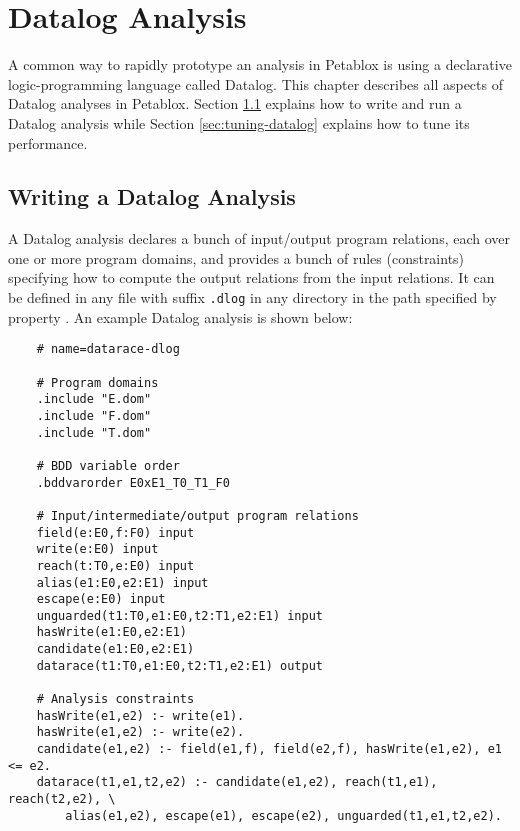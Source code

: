 \chapter{Datalog Analysis}
\label{chap:datalog}

A common way to rapidly prototype an analysis in Petablox is using a declarative
logic-programming language called Datalog.  This chapter describes all aspects
of Datalog analyses in Petablox.  Section \ref{sec:writing-datalog} explains how to
write and run a Datalog analysis while Section \ref{sec:tuning-datalog} explains how
to tune its performance.

\section{Writing a Datalog Analysis}
\label{sec:writing-datalog}

A Datalog analysis declares a bunch of input/output program relations, each over
one or more program domains, and provides a bunch of rules (constraints)
specifying how to compute the output relations from the input relations.  It can
be defined in any file with suffix {\tt .dlog} in any directory in the path
specified by property .  An example Datalog
analysis is shown below:

\texonly{\newpage}

\begin{framed}
{\small
\begin{verbatim}
    # name=datarace-dlog

    # Program domains
    .include "E.dom"
    .include "F.dom"
    .include "T.dom"

    # BDD variable order
    .bddvarorder E0xE1_T0_T1_F0

    # Input/intermediate/output program relations
    field(e:E0,f:F0) input
    write(e:E0) input
    reach(t:T0,e:E0) input
    alias(e1:E0,e2:E1) input
    escape(e:E0) input
    unguarded(t1:T0,e1:E0,t2:T1,e2:E1) input
    hasWrite(e1:E0,e2:E1)
    candidate(e1:E0,e2:E1) 
    datarace(t1:T0,e1:E0,t2:T1,e2:E1) output

    # Analysis constraints
    hasWrite(e1,e2) :- write(e1).
    hasWrite(e1,e2) :- write(e2).
    candidate(e1,e2) :- field(e1,f), field(e2,f), hasWrite(e1,e2), e1 <= e2.
    datarace(t1,e1,t2,e2) :- candidate(e1,e2), reach(t1,e1), reach(t2,e2), \
        alias(e1,e2), escape(e1), escape(e2), unguarded(t1,e1,t2,e2).
\end{verbatim}
}
\end{framed}


